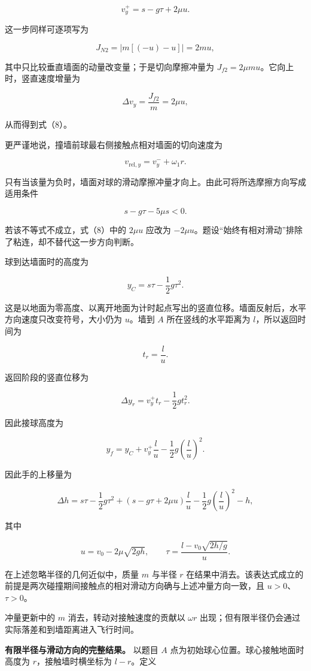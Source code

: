 \documentclass[12pt,a4paper,UTF8]{ctexart}
\begin{document}
\[v_y^+=s-g\tau+2\mu u. \tag{8}\]

这一步同样可逐项写为

\[J_{N2}=\left|m[(-u)-u]\right|=2mu,\]

其中只比较垂直墙面的动量改变量；于是切向摩擦冲量为
\(J_{f2}=2\mu m u\)。它向上时，竖直速度增量为

\[\Delta v_y=\frac{J_{f2}}m=2\mu u,\]

从而得到式（8）。

更严谨地说，撞墙前球最右侧接触点相对墙面的切向速度为

\[v_{\mathrm{rel},y}=v_y^-+\omega_1r.\]

只有当该量为负时，墙面对球的滑动摩擦冲量才向上。由此可将所选摩擦方向写成适用条件

\[s-g\tau-5\mu s<0.\]

若该不等式不成立，式（8）中的 \(2\mu u\) 应改为
\(-2\mu u\)。题设``始终有相对滑动''排除了粘连，却不替代这一步方向判断。

球到达墙面时的高度为

\[y_C=s\tau-\frac12g\tau^2.\]

这是以地面为零高度、以离开地面为计时起点写出的竖直位移。墙面反射后，水平方向速度只改变符号，大小仍为
\(u\)。墙到 \(A\) 所在竖线的水平距离为 \(l\)，所以返回时间为

\[t_r=\frac lu.\]

返回阶段的竖直位移为

\[\Delta y_r=v_y^+t_r-\frac12gt_r^2.\]

因此接球高度为

\[y_f=y_C+v_y^+\frac{l}{u}-\frac12g\left(\frac{l}{u}\right)^2.\]

因此手的上移量为

\[\boxed{\Delta h=s\tau-\frac12g\tau^2+\left(s-g\tau+2\mu u\right)\frac{l}{u}-\frac12g\left(\frac{l}{u}\right)^2-h},\]

其中

\[u=v_0-2\mu\sqrt{2gh},\qquad
\tau=\frac{l-v_0\sqrt{2h/g}}{u}.\]

在上述忽略半径的几何近似中，质量 \(m\) 与半径 \(r\)
在结果中消去。该表达式成立的前提是两次碰撞期间接触点的相对滑动方向确与上述冲量方向一致，且
\(u>0\)、\(\tau>0\)。

冲量更新中的 \(m\) 消去，转动对接触速度的贡献以 \(\omega r\)
出现；但有限半径仍会通过实际落差和到墙距离进入飞行时间。

\textbf{有限半径与滑动方向的完整结果。} 以题目 \(A\)
点为初始球心位置。球心接触地面时高度为 \(r\)，接触墙时横坐标为
\(l-r\)。定义
\end{document}
